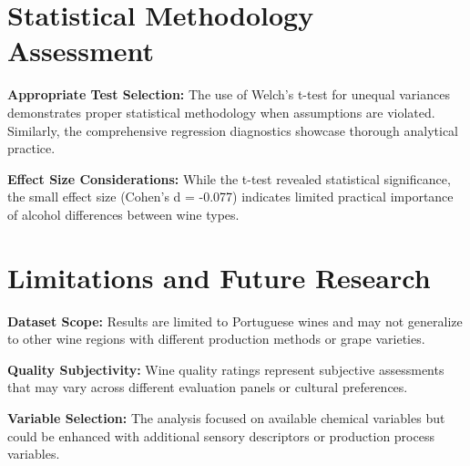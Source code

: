 \section{Statistical Methodology Assessment}

\textbf{Appropriate Test Selection:} The use of Welch's t-test for unequal variances demonstrates proper statistical methodology when assumptions are violated. Similarly, the comprehensive regression diagnostics showcase thorough analytical practice.

\textbf{Effect Size Considerations:} While the t-test revealed statistical significance, the small effect size (Cohen's d = -0.077) indicates limited practical importance of alcohol differences between wine types.

\section{Limitations and Future Research}

\textbf{Dataset Scope:} Results are limited to Portuguese wines and may not generalize to other wine regions with different production methods or grape varieties.

\textbf{Quality Subjectivity:} Wine quality ratings represent subjective assessments that may vary across different evaluation panels or cultural preferences.

\textbf{Variable Selection:} The analysis focused on available chemical variables but could be enhanced with additional sensory descriptors or production process variables.